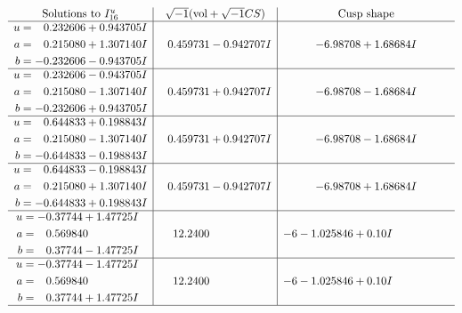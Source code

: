 \documentclass[1p]{elsarticle_modified}
\theoremstyle{definition}
\newcommand{\I}{\sqrt{-1}}
\begin{document}
$$\begin{array}{c|c|c}  
\text{Solutions to }I^u_{16}& \I (\text{vol} + \sqrt{-1}CS) & \text{Cusp shape}\\
 \hline 
\begin{aligned}
u &= \phantom{-}0.232606 + 0.943705 I \\
a &= \phantom{-}0.215080 + 1.307140 I \\
b &= -0.232606 - 0.943705 I\end{aligned}
 & \phantom{-}0.459731 - 0.942707 I & -6.98708 + 1.68684 I \\ \hline\begin{aligned}
u &= \phantom{-}0.232606 - 0.943705 I \\
a &= \phantom{-}0.215080 - 1.307140 I \\
b &= -0.232606 + 0.943705 I\end{aligned}
 & \phantom{-}0.459731 + 0.942707 I & -6.98708 - 1.68684 I \\ \hline\begin{aligned}
u &= \phantom{-}0.644833 + 0.198843 I \\
a &= \phantom{-}0.215080 - 1.307140 I \\
b &= -0.644833 - 0.198843 I\end{aligned}
 & \phantom{-}0.459731 + 0.942707 I & -6.98708 - 1.68684 I \\ \hline\begin{aligned}
u &= \phantom{-}0.644833 - 0.198843 I \\
a &= \phantom{-}0.215080 + 1.307140 I \\
b &= -0.644833 + 0.198843 I\end{aligned}
 & \phantom{-}0.459731 - 0.942707 I & -6.98708 + 1.68684 I \\ \hline\begin{aligned}
u &= -0.37744 + 1.47725 I \\
a &= \phantom{-}0.569840\phantom{ +0.000000I} \\
b &= \phantom{-}0.37744 - 1.47725 I\end{aligned}
 & \phantom{-}12.2400\phantom{ +0.000000I} &                  -6
-1.025846 + 0. 10   I\phantom{ +0.000000I} \\ \hline\begin{aligned}
u &= -0.37744 - 1.47725 I \\
a &= \phantom{-}0.569840\phantom{ +0.000000I} \\
b &= \phantom{-}0.37744 + 1.47725 I\end{aligned}
 & \phantom{-}12.2400\phantom{ +0.000000I} &                  -6
-1.025846 + 0. 10   I\phantom{ +0.000000I}\\
 \hline 
 \end{array}$$\newpage\newpage\renewcommand{\arraystretch}{1}
\end{document}
